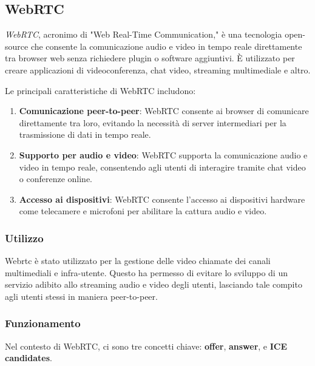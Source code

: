 %
%
%
\subsection{WebRTC}

\emph{WebRTC}, acronimo di "Web Real-Time Communication," è una tecnologia open-source che consente la comunicazione audio e video in tempo reale direttamente tra browser web senza richiedere plugin o software aggiuntivi.
%
È utilizzato per creare applicazioni di videoconferenza, chat video, streaming multimediale e altro.

Le principali caratteristiche di WebRTC includono:

\begin{enumerate}
    \item \textbf{Comunicazione peer-to-peer}: WebRTC consente ai browser di comunicare direttamente tra loro, evitando la necessità di server intermediari per la trasmissione di dati in tempo reale.

    \item \textbf{Supporto per audio e video}: WebRTC supporta la comunicazione audio e video in tempo reale, consentendo agli utenti di interagire tramite chat video o conferenze online.

    \item \textbf{Accesso ai dispositivi}: WebRTC consente l'accesso ai dispositivi hardware come telecamere e microfoni per abilitare la cattura audio e video.
\end{enumerate}

%
%
%
\subsubsection{Utilizzo}

Webrtc è stato utilizzato per la gestione delle video chiamate dei canali multimediali e infra-utente.
%
Questo ha permesso di evitare lo sviluppo di un servizio adibito allo streaming audio e video degli utenti, lasciando tale compito agli utenti stessi in maniera peer-to-peer.

%
%
%
\subsubsection{Funzionamento}

Nel contesto di WebRTC, ci sono tre concetti chiave: \textbf{offer}, \textbf{answer}, e \textbf{ICE candidates}.

